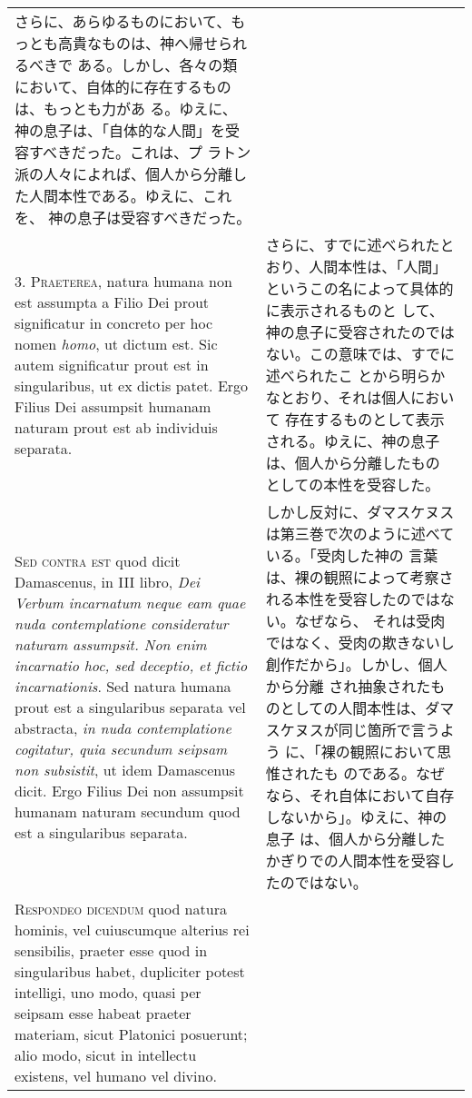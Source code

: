 \documentclass[10pt]{jsarticle} %
\begin{document}
\begin{longtable}{p{21em}p{21em}}
さらに、あらゆるものにおいて、もっとも高貴なものは、神へ帰せられるべきで
 ある。しかし、各々の類において、自体的に存在するものは、もっとも力があ
 る。ゆえに、神の息子は、「自体的な人間」を受容すべきだった。これは、プ
 ラトン派の人々によれば、個人から分離した人間本性である。ゆえに、これを、
 神の息子は受容すべきだった。

\\



3. {\scshape Praeterea}, natura humana non est assumpta a Filio Dei prout significatur
in concreto per hoc nomen {\itshape homo}, ut dictum est. Sic autem significatur
prout est in singularibus, ut ex dictis patet. Ergo Filius Dei assumpsit
humanam naturam prout est ab individuis separata.


&

さらに、すでに述べられたとおり、人間本性は、「人間」というこの名によって具体的に表示されるものと
 して、神の息子に受容されたのではない。この意味では、すでに述べられたこ
 とから明らかなとおり、それは個人において
 存在するものとして表示される。ゆえに、神の息子は、個人から分離したもの
 としての本性を受容した。

\\



{\scshape Sed contra est} quod dicit Damascenus, in III libro, {\itshape Dei Verbum
incarnatum neque eam quae nuda contemplatione consideratur naturam
assumpsit. Non enim incarnatio hoc, sed deceptio, et fictio
incarnationis}. Sed natura humana prout est a singularibus separata vel
abstracta, {\itshape in nuda contemplatione cogitatur, quia secundum seipsam non
subsistit}, ut idem Damascenus dicit. Ergo Filius Dei non assumpsit
humanam naturam secundum quod est a singularibus separata.


&

しかし反対に、ダマスケヌスは第三巻で次のように述べている。「受肉した神の
 言葉は、裸の観照によって考察される本性を受容したのではない。なぜなら、
 それは受肉ではなく、受肉の欺きないし創作だから」。しかし、個人から分離
 され抽象されたものとしての人間本性は、ダマスケヌスが同じ箇所で言うよう
 に、「裸の観照において思惟されたも
 のである。なぜなら、それ自体において自存しないから」。ゆえに、神の息子
 は、個人から分離したかぎりでの人間本性を受容したのではない。


\\



{\scshape Respondeo dicendum} quod natura hominis, vel cuiuscumque alterius rei
sensibilis, praeter esse quod in singularibus habet, dupliciter potest
intelligi, uno modo, quasi per seipsam esse habeat praeter materiam,
sicut Platonici posuerunt; alio modo, sicut in intellectu existens, vel
humano vel divino. 


\end{longtable}
\end{document}
